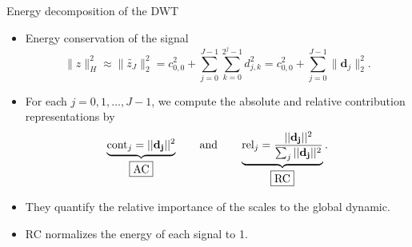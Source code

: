 
\begin{frame}{Energy decomposition of the DWT}

\begin{block}{ }
 \begin{itemize}
  \item Energy conservation of the signal
\vspace*{-0.15cm}
  \begin{equation*}\label{eq:energy}  
     \| z \|_H^2    \approx     \| \widetilde{z_J} \|_2^2 
        = c_{0,0}^2 + \sum_{j=0}^{J-1} \sum_{k=0}^{2^j-1} d_{j,k} ^2  = 
                     c_{0,0}^2 + \sum_{j=0}^{J-1} \| \mathbf{d}_{j} \|_2^2.
  \end{equation*}
 \item For each $j=0,1,\ldots,J-1$, we compute the absolute and 
 relative contribution representations by
\vspace*{-0.15cm}      
   \[ \underbrace{\hbox{cont}_j = ||\mathbf{d_j}||^2}_{\fbox{AC}}  
      \qquad  \text{and}  \qquad
       \underbrace{\hbox{rel}_j  = 
     \frac{||\mathbf{d_j}||^2}
          {\sum_j ||\mathbf{d_j}||^2 }}_{\fbox{RC}} .\]
 \item They quantify the relative importance of the scales to the global dynamic.
 \item RC normalizes the energy of each signal to 1.
\end{itemize}
\end{block}
\end{frame}


